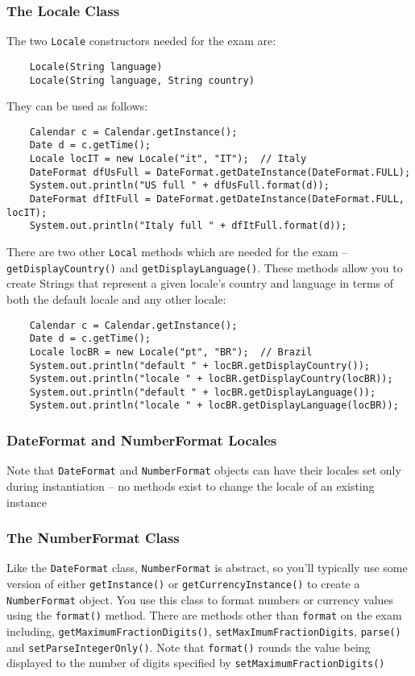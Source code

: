 \subsubsection{The Locale Class}
The two \verb#Locale# constructors needed for the exam are:
\begin{verbatim}
    Locale(String language)
    Locale(String language, String country)
\end{verbatim}
They can be used as follows:
\begin{verbatim}
    Calendar c = Calendar.getInstance();
    Date d = c.getTime();
    Locale locIT = new Locale("it", "IT");  // Italy
    DateFormat dfUsFull = DateFormat.getDateInstance(DateFormat.FULL);
    System.out.println("US full " + dfUsFull.format(d));
    DateFormat dfItFull = DateFormat.getDateInstance(DateFormat.FULL, locIT);
    System.out.println("Italy full " + dfItFull.format(d));
\end{verbatim}
There are two other \verb#Local# methods which are needed for the exam -- 
\verb#getDisplayCountry()# and \verb#getDisplayLanguage()#. These methods allow 
you to create Strings that represent a given locale's country and language in 
terms of both the default locale and any other locale:
\begin{verbatim}
    Calendar c = Calendar.getInstance();
    Date d = c.getTime();
    Locale locBR = new Locale("pt", "BR");  // Brazil
    System.out.println("default " + locBR.getDisplayCountry());
    System.out.println("locale " + locBR.getDisplayCountry(locBR));
    System.out.println("default " + locBR.getDisplayLanguage());
    System.out.println("locale " + locBR.getDisplayLanguage(locBR));
\end{verbatim}

\subsubsection{DateFormat and NumberFormat Locales}
Note that \verb#DateFormat# and \verb#NumberFormat# objects can have their 
locales set only during instantiation -- no methods exist to change the locale 
of an existing instance

\subsubsection{The NumberFormat Class}
Like the \verb#DateFormat# class, \verb#NumberFormat# is abstract, so you'll 
typically use some version of either \verb#getInstance()# or 
\verb#getCurrencyInstance()# to create a \verb#NumberFormat# object. You use 
this class to format numbers or currency values using the \verb#format()# 
method. There are methods other than \verb#format# on the exam including, 
\verb#getMaximumFractionDigits()#, \verb#setMaxImumFractionDigits#, 
\verb#parse()# and \verb#setParseIntegerOnly()#. Note that \verb#format()# 
rounds the value being displayed to the number of digits specified by 
\verb#setMaximumFractionDigits()#

